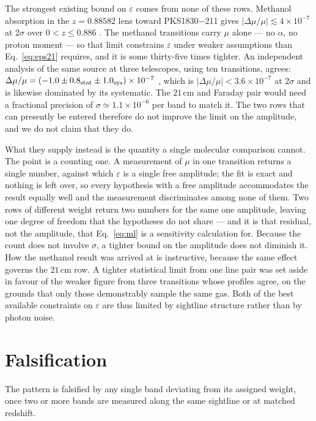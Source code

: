 \documentclass[aps,prd,twocolumn,superscriptaddress,nofootinbib,10pt]{revtex4-2}
\begin{document}
The strongest existing bound on $\varepsilon$ comes from none of these rows. Methanol absorption in
the $z = 0.88582$ lens toward PKS1830$-$211 gives
$|\Delta\mu/\mu| \lesssim 4 \times 10^{-7}$ at $2\sigma$ over $0 < z \leq 0.886$
\citep{KanekarMethanol2015}. The methanol transitions carry $\mu$ alone --- no $\alpha$, no proton
moment --- so that limit constrains $\varepsilon$ under weaker assumptions than
Eq.~\eqref{eq:eps21} requires, and it is some thirty-five times tighter. An independent analysis of the
same source at three telescopes, using ten transitions, agrees:
$\Delta\mu/\mu = (-1.0 \pm 0.8_{\rm stat} \pm 1.0_{\rm sys}) \times 10^{-7}$
\citep{BagdonaiteMethanol2013}, which is $|\Delta\mu/\mu| < 3.6 \times 10^{-7}$ at $2\sigma$ and is
likewise dominated by its systematic. The $21\,$cm and Faraday pair
would need a fractional precision of $\sigma \simeq 1.1 \times 10^{-6}$ per band to match it. The
two rows that can presently be entered therefore do not improve the limit on the amplitude, and we
do not claim that they do.

What they supply instead is the quantity a single molecular comparison cannot. The point is a
counting one. A measurement of $\mu$ in one transition returns a single number, against which
$\varepsilon$ is a single free amplitude; the fit is exact and nothing is left over, so every
hypothesis with a free amplitude accommodates the result equally well and the measurement
discriminates among none of them. Two rows of different weight return two numbers for the same one
amplitude, leaving one degree of freedom that the hypotheses do not share --- and it is that
residual, not the amplitude, that Eq.~\eqref{eq:ml} is a sensitivity calculation for. Because the
count does not involve $\sigma$, a tighter bound on the amplitude does not diminish it. How the
methanol result was arrived at is instructive, because the same effect governs the $21\,$cm row. A
tighter statistical limit from one line pair was set aside in favour of the weaker figure from three
transitions whose profiles agree, on the grounds that only those demonstrably sample the same gas.
Both of the best available constraints on $\varepsilon$ are thus limited by sightline structure
rather than by photon noise.

\section{Falsification}

The pattern is falsified by any single band deviating from its assigned weight, once two or more
bands are measured along the same sightline or at matched redshift.
\end{document}
